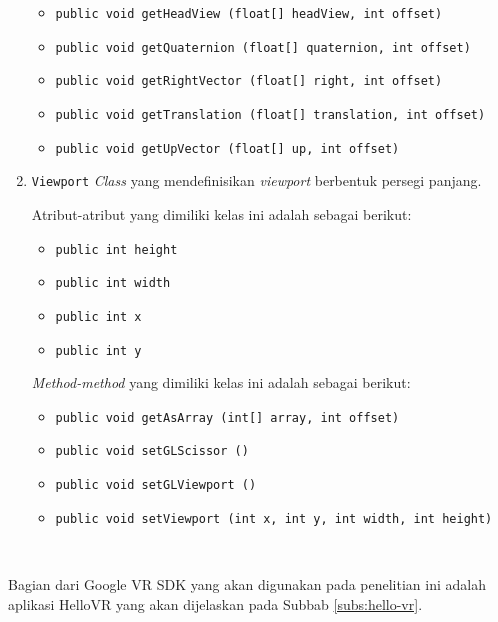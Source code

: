 \begin{enumerate}
\begin{itemize}
			\item \texttt{public void getHeadView (float[] headView, int offset)}
			
			\item \texttt{public void getQuaternion (float[] quaternion, int offset)}
			\item \texttt{public void getRightVector (float[] right, int offset)}
			
			\item \texttt{public void getTranslation (float[] translation, int offset)}
			
			\item \texttt{public void getUpVector (float[] up, int offset)}
		\end{itemize}			
		
		\item \texttt{Viewport}
		\textit{Class} yang mendefinisikan \textit{viewport} berbentuk persegi panjang. 
		
		Atribut-atribut yang dimiliki kelas ini adalah sebagai berikut:
		
		\begin{itemize}
			\item \texttt{public int height}
			
			\item \texttt{public int width}
			
			\item \texttt{public int x}
			
			\item \texttt{public int y}
		\end{itemize}
			
		\textit{Method-method} yang dimiliki kelas ini adalah sebagai berikut:
		
		\begin{itemize}
			\item \texttt{public void getAsArray (int[] array, int offset)}
			
			\item \texttt{public void setGLScissor ()}
			
			\item \texttt{public void setGLViewport ()}
			
			\item \texttt{public void setViewport (int x, int y, int width, int height)}
		\end{itemize}
	 ~\cite{google-vr-sdk}
	\end{enumerate}
 
Bagian dari Google VR SDK yang akan digunakan pada penelitian ini adalah aplikasi HelloVR yang akan dijelaskan pada Subbab \ref{subs:hello-vr}. 

